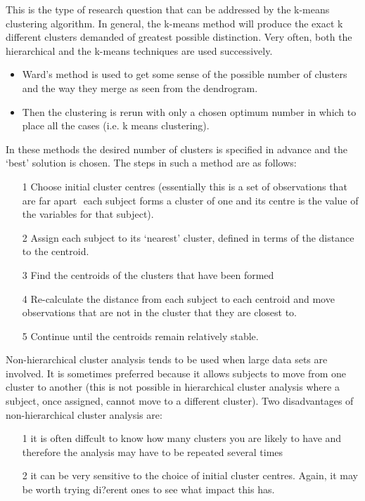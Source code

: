 This is the type of research question that can be addressed by the k-means clustering algorithm. In general, the k-means method will produce the exact k different clusters demanded of greatest possible distinction. Very often, both the hierarchical and the k-means techniques are used successively.
\begin{itemize}
	\item Ward's method is used to get some sense of the possible number of clusters and the way they merge as seen from the dendrogram.
	\item Then the clustering is rerun with only a chosen optimum number in which to place all
	the cases (i.e. k means clustering).
\end{itemize}
In these methods the desired number of clusters is specified in advance and the `best' solution
is chosen. The steps in such a method are as follows:
\begin{itemize}
	\item[1] Choose initial cluster centres (essentially this is a set of observations that are far apart
	 each subject forms a cluster of one and its centre is the value of the variables for
	that subject).
	\item[2] Assign each subject to its `nearest' cluster, defined in terms of the distance to the
	centroid.
	\item[3] Find the centroids of the clusters that have been formed
	\item[4] Re-calculate the distance from each subject to each centroid and move observations that
	are not in the cluster that they are closest to.
	\item[5] Continue until the centroids remain relatively stable.
\end{itemize}
Non-hierarchical cluster analysis tends to be used when large data sets are involved. It is
sometimes preferred because it allows subjects to move from one cluster to another (this is
not possible in hierarchical cluster analysis where a subject, once assigned, cannot move to a
different cluster). Two disadvantages of non-hierarchical cluster analysis are: 
\begin{itemize}
	\item[1]it is often
	diffcult to know how many clusters you are likely to have and therefore the analysis may have
	to be repeated several times 
	\item[2] it can be very sensitive to the choice of initial cluster centres. Again, it may be worth trying di?erent ones to see what impact this has.
\end{itemize}
